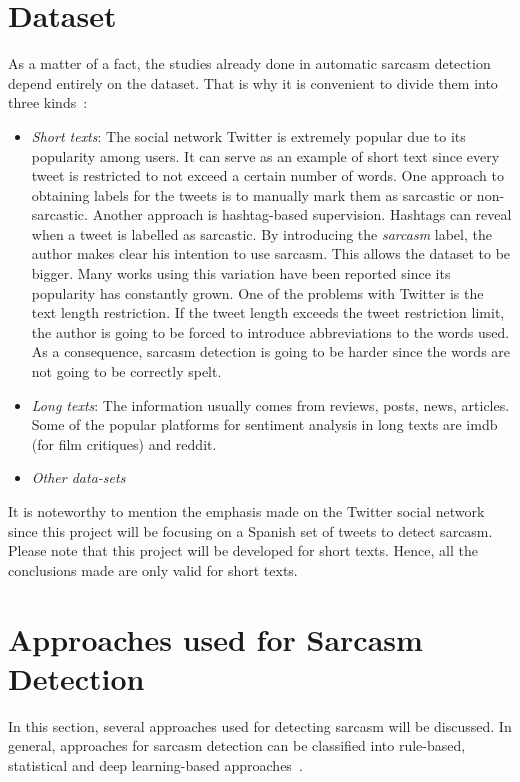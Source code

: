 \section{Dataset}

As a matter of a fact, the studies already done in automatic sarcasm detection depend entirely on the dataset. That is why it is convenient to divide them into three kinds~\cite{joshi2017automatic}:
\begin{itemize}
	\item \textit{Short texts}: The social network Twitter is extremely popular due to its popularity among users. It can serve as an example of short text since every tweet is restricted to not exceed a certain number of words. One approach to obtaining labels for the tweets is to manually mark them as sarcastic or non-sarcastic. Another approach is hashtag-based supervision. Hashtags can reveal when a tweet is labelled as sarcastic. By introducing the \textit{sarcasm} label, the author makes clear his intention to use sarcasm.  This allows the dataset to be bigger. Many works using this variation have been reported since its popularity has constantly grown. One of the problems with Twitter is the text length restriction. If the tweet length exceeds the tweet restriction limit, the author is going to be forced to introduce abbreviations to the words used. As a consequence, sarcasm detection is going to be harder since the words are not going to be correctly spelt.
	\item \textit{Long texts}: The information usually comes from reviews, posts, news, articles. Some of the popular platforms for sentiment analysis in long texts are imdb (for film critiques) and reddit. 
	\item \textit{Other data-sets}
\end{itemize}

It is noteworthy to mention the emphasis made on the Twitter social network since this project will be focusing on a Spanish set of tweets to detect sarcasm. Please note that this project will be developed for short texts. Hence, all the conclusions made are only valid for short texts.

\section{Approaches used for Sarcasm Detection}
\label{sec:sarcasmapproach}
In this section, several approaches used for detecting sarcasm will be discussed. In general, approaches for sarcasm detection can be classified into rule-based, statistical and deep learning-based approaches~\cite{joshi2017automatic}.
